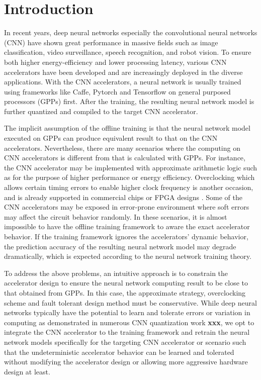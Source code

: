 \section{Introduction} \label{sec:intro}
In recent years, deep neural networks especially the convolutional neural networks (CNN) 
have shown great performance in massive fields such as image classification, 
video surveillance, speech recognition, and robot vision. To ensure both 
higher energy-efficiency and lower processing latency, various CNN accelerators 
\cite{pipecnn_2,Zhang2015_9,Qiu2016_10,deepburing_12,Farabet2010_13,Zeng2018_18} 
have been developed and are increasingly deployed in the diverse applications. 
With the CNN accelerators, a neural network is usually trained 
using frameworks like Caffe, Pytorch and Tensorflow on general purposed 
processors (GPPs) first. After the training, the resulting neural network 
model is further quantized and compiled to the target CNN accelerator. 

The implicit assumption of the offline training is that the neural 
network model executed on GPPs can produce equivalent result to 
that on the CNN accelerators. Nevertheless, there are 
many scenarios where the computing on CNN accelerators 
is different from that is calculated with GPPs. For instance, the 
CNN accelerator may be implemented with approximate arithmetic logic 
such as \cite{Approximate_Multiplier_31,Approximate_32,approximate_33} for 
the purpose of higher performance or energy efficiency. 
Overclocking  \cite{overclock_3,Paceline_15,overclock_35} which allows certain 
timing errors to enable higher clock frequency
is another occasion, and is already supported in commercial chips 
or FPGA designs \cite{overclock_retain_34,overclock_Algorithm_36}. Some of the CNN accelerators may be 
exposed in error-prone environment where soft errors 
may affect the circuit behavior randomly. 
In these scenarios, it is almost impossible to have the offline training 
framework to aware the exact accelerator behavior. 
If the training framework ignores the accelerators’ dynamic 
behavior, the prediction accuracy of the resulting neural 
network model may degrade dramatically, which is expected according to 
the neural network training theory.

To address the above problems, an intuitive approach is to 
constrain the accelerator design to ensure the neural 
network computing result to be close to that obtained from GPPs. 
In this case, the approximate strategy, overclocking scheme and 
fault tolerant design method must be conservative. 
While deep neural networks typically have the potential to 
learn and tolerate errors or variation in computing as demonstrated in 
numerous CNN quantization work \textbf{xxx}, we opt to 
integrate the CNN accelerator to the training framework 
and retrain the neural network models specifically for the 
targeting CNN accelerator or scenario such that the undeterministic 
accelerator behavior can be learned and tolerated without 
modifying the accelerator design or allowing more aggressive 
hardware design at least. 

